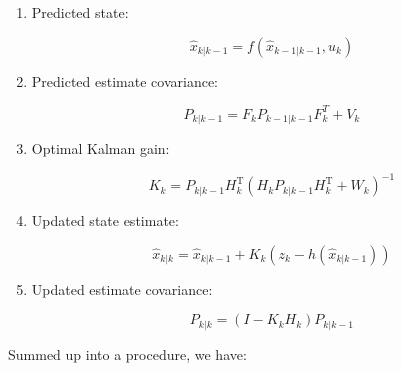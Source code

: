 \begin{enumerate}
\item
  Predicted state:

  \[\hat{x}_{k|k-1} = f(\hat{x}_{k-1|k-1}, u_{k})\]
\item
  Predicted estimate covariance:

  \[P_{k|k-1} = F_{k} P_{k-1|k-1} F_{k}^{T} + V_{k}\]
\item
  Optimal Kalman gain:

  \[K_k = P_{k|k-1}H_k^\text{T}\left(H_k
  P_{k|k-1} H_k^\text{T} + W_k\right)^{-1}\]
\item
  Updated state estimate:

  \[\hat{x}_{k|k} =\hat{x}_{k|k-1} + K_k \left(z_k - h(\hat{x}_{k|k-1})\right)\]
\item
  Updated estimate covariance:

  \[P_{k|k} =
    (I - K_k H_k) P_{k|k-1}\]
\end{enumerate}

Summed up into a procedure, we have:

